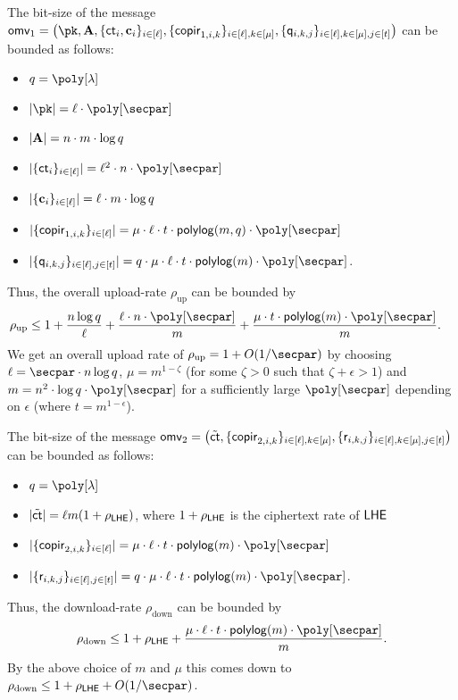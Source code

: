 The bit-size of the message $\omv_1=\left(\pk,\vc{A},\{\ct_i, \vc{c}_i\}_{i\in [\ell]},\{\copir_{1,i,k}\}_{i\in [\ell],k\in[\mu]},\{\quer_{i,k,j}\}_{i \in [\ell],k\in[\mu], j \in [t]}\right)$ can be bounded as follows:
\begin{itemize}
\item $q=\poly[\lambda]$
\item $|\pk| = \ell \cdot \poly[\secpar]$
\item $|\mathbf{A}| = n \cdot m\cdot \log q$
\item $|\{\ct_i\}_{i \in [\ell]}| = \ell^2 \cdot n \cdot \poly[\secpar]$
\item $|\{\mathbf{c}_i\}_{i\in [\ell]}| = \ell \cdot m\cdot \log q$
\item $|\{\copir_{1,i,k}\}_{i\in [\ell]}|=\mu \cdot \ell \cdot t \cdot \mathsf{polylog}(m,q)\cdot \poly[\secpar]$
\item $|\{\quer_{i,k,j}\}_{i \in [\ell], j \in [t]}| = q\cdot \mu\cdot\ell \cdot t \cdot\mathsf{polylog}(m)\cdot \poly[\secpar]$.
\end{itemize}
Thus, the overall upload-rate $\rho_{\text{up}}$ can be bounded by
\begin{align*}
\rho_{\text{up}} &\leq 1 + \frac{n\log q}{\ell} + \frac{\ell \cdot n\cdot \poly[\secpar]}{m} + \frac{\mu\cdot t\cdot\mathsf{polylog}(m) \cdot \poly[\secpar]}{m}.
\end{align*}
We get an overall upload rate of $\rho_{\text{up}} = 1 + O(1 / \secpar)$ by choosing $\ell = \secpar \cdot n \log q$, $\mu=m^{1-\zeta}$ (for some $\zeta>0$ such that $\zeta + \epsilon>1$) and $m = n^2\cdot\log q \cdot \poly[\secpar]$ for a sufficiently large $\poly[\secpar]$ depending on $\epsilon$ (where $t = m^{1 - \epsilon}$).


The bit-size of the message $\mathsf{omv}_2=\left(\tilde{\mathsf{ct}},\{\mathsf{copir}_{2,i,k}\}_{i\in[\ell],k\in[\mu]}, \{\mathsf{r}_{i,k,j}\}_{i \in [\ell],k\in[\mu] ,j \in [t]} \right)$ can be bounded as follows:
\begin{itemize}
\item $q=\poly[\lambda]$
    \item $|\tilde{\mathsf{ct}}| = \ell m (1 + \rho_{\mathsf{LHE}})$, where $1 + \rho_{\mathsf{LHE}}$ is the ciphertext rate of $\mathsf{LHE}$
    \item $|\{\copir_{2,i,k}\}_{i\in[ \ell]}|=\mu \cdot \ell \cdot  t\cdot\mathsf{polylog}(m) \cdot \poly[\secpar]$
    \item $|\{\resp_{i,k,j}\}_{i \in [\ell], j \in [t]}| =q\cdot \mu \cdot \ell \cdot    t\cdot\mathsf{polylog}(m) \cdot \poly[\secpar]$.
\end{itemize}
Thus, the download-rate $\rho_{\text{down}}$ can be bounded by
\[
\rho_{\text{down}}  \leq 1 + \rho_{\LHE} + \frac{\mu\cdot \ell\cdot  t\cdot\mathsf{polylog}(m) \cdot \poly[\secpar]}{m}.
\]
By the above choice of $m$ and $\mu$ this comes down to $\rho_{\text{down}} \leq 1 + \rho_{\LHE} + O(1/\secpar)$.


